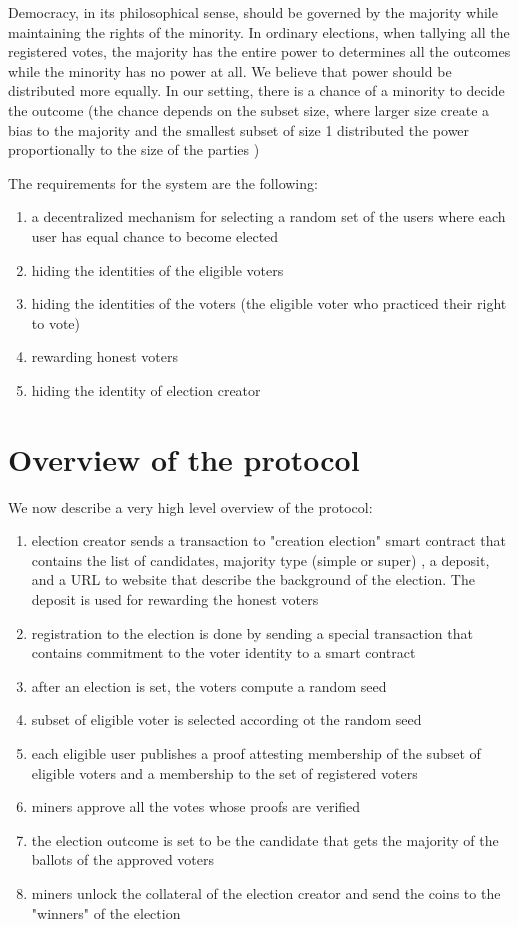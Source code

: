 \documentclass[]{paper}
\begin{document}
Democracy, in its philosophical sense, should be governed by the majority while maintaining the rights of the minority. In ordinary elections, when tallying all the registered votes,  the majority has the entire power to determines all the outcomes while the minority has no power at all. We believe that power should be distributed more equally. 
 In our setting, there is a chance of a minority to decide the outcome (the chance depends on the subset size, where larger size create a bias to the majority and the smallest subset of size 1 distributed the power proportionally to the size of the parties )




The requirements for the system are the following:
\begin{enumerate} 	
	\item a decentralized mechanism for selecting a random set of the users where each user has equal chance to become elected
	\item hiding the identities of the eligible voters
	\item hiding the identities of the voters (the eligible voter who practiced their right to vote)
	\item rewarding honest voters
	\item hiding the identity of election creator
\end{enumerate}




	\section{Overview of the protocol}
We now describe a very high level overview of the protocol:
\begin{enumerate}
	\item election creator sends a transaction to "creation election" smart contract that contains the list of candidates,  majority type (simple or super) , a deposit, and a URL to website that describe the background of the election. The deposit is used for rewarding the honest voters
	\item registration to the election is done by sending a special transaction that contains commitment to the voter identity to a smart contract
	\item after an election is set, the voters compute a random seed 
	\item subset of eligible voter is selected according ot the random seed
	\item each eligible user publishes a proof attesting membership of the subset of eligible voters and a membership to the set of registered voters
	\item miners approve all the votes whose proofs are verified
	\item the election outcome is set to be the candidate that gets the majority of the ballots of the approved voters
	\item miners unlock the collateral of the election creator and send the coins to the "winners" of the election
\end{enumerate}
\end{document}
